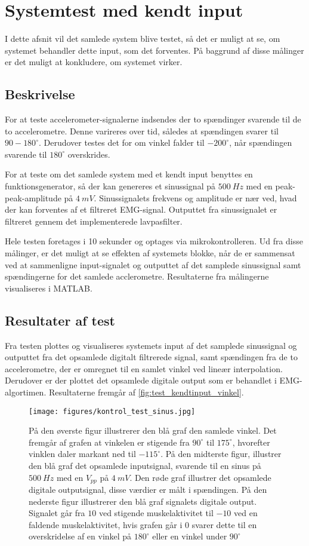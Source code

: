 \section{Systemtest med kendt input}
I dette afsnit vil det samlede system blive testet, så det er muligt at se, om systemet behandler dette input, som det forventes. På baggrund af disse målinger er det muligt at konkludere, om systemet virker. 

\subsection{Beskrivelse}
For at teste accelerometer-signalerne indsendes der to spændinger svarende til de to accelerometre. Denne varireres over tid, således at spændingen svarer til $90-180^{\circ}$. Derudover testes det for om vinkel falder til $-200^{\circ}$, når spændingen svarende til $180^{\circ}$ overskrides. 

For at teste om det samlede system med et kendt input benyttes en funktionsgenerator, så der kan genereres et sinussignal på $500~Hz$ med en peak-peak-amplitude på $4~mV$. Sinussignalets frekvens og amplitude er nær ved, hvad der kan forventes af et filtreret EMG-signal. Outputtet fra sinussignalet er filtreret gennem det implementerede lavpasfilter. 


Hele testen foretages i 10 sekunder og optages via mikrokontrolleren. Ud fra disse målinger, er det muligt at se effekten af systemets blokke, når de er sammensat ved at sammenligne input-signalet og outputtet af det samplede sinussignal samt spændingerne for det samlede acclerometre. Resultaterne fra målingerne visualiseres i MATLAB. 


\subsection{Resultater af test}
Fra testen plottes og visualiseres systemets input af det samplede sinussignal og outputtet fra det opsamlede digitalt filtrerede signal, samt spændingen fra de to accelerometre, der er omregnet til en samlet vinkel ved lineær interpolation. Derudover er der plottet det opsamlede digitale output som er behandlet i EMG-algortimen. Resultaterne fremgår af \autoref{fig:test_kendtinput_vinkel}. 

\begin{figure}[H]
\centering
\texttt{[image: figures/kontrol\_test\_sinus.jpg]}
\caption{På den øverste figur illustrerer den blå graf den samlede vinkel. Det fremgår af grafen at vinkelen er stigende fra $90^{\circ}$ til $175^{\circ}$, hvorefter vinklen daler markant ned til $-115^{\circ}$. 
På den midterste figur, illustrer den blå graf det opsamlede inputsignal, svarende til en sinus på $500~Hz$ med en $V_{pp}$ på $4~mV$. Den røde graf illustrer det opsamlede digitale outputsignal, disse værdier er målt i spændingen. 
På den nederste figur illustrerer den blå graf signalets digitale output. Signalet går fra $10$ ved stigende muskelaktivitet til $-10$ ved en faldende muskelaktivitet, hvis grafen går i $0$ svarer dette til en overskridelse af en vinkel på $180^{\circ}$ eller en vinkel under $90^{\circ}$}
\label{fig:test_kendtinput}
\end{figure}

